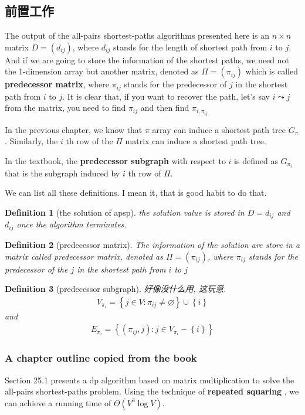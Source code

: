 \documentclass[a4paper, 10pt]{ctexart} %
\newtheorem{definition}{Definition}
\begin{document}
\subsection{前置工作}
The output of the all-pairs shortest-paths algorithms
presented here is an $n \times n   $ matrix $D = \left( d _{ij}\right)$, 
where $d _{ij}$ stands for the length of shortest path from 
$i$ to $j$. And if we are going to store the 
information of the 
shortest paths, we need not the 1-dimension 
array but another matrix, 
denoted as $\Pi = \left( \pi_{ij}\right)$ 
which is called \textbf{predecessor matrix}, where 
$\pi_{ij}$ stands for the predecessor of 
$j$ in the shortest path from $i$ to $j$.
It is clear that, if you want to 
recover the path, let's say $i \leadsto j$ from the matrix, you need to 
find $\pi_{ij}$ and then find $\pi_{i ,\pi_{ij}}$

In the previous chapter, we know that 
$\pi$ array can induce a shortest path tree $G_{\pi }$. 
Similarly, the $i$ th row of the $\Pi$ 
matrix can induce a shortest path tree.

In the textbook, the \textbf{predecessor subgraph} with respect to $i$ is defined
as $G_{\pi_{i}}$ that is the subgraph 
induced by $i$ th row of $\Pi$. 

We can list all these definitions. I mean it, that is 
good habit to do that.
\begin{definition}[the solution of apsp]
the solution value is stored in $D = d _{ij}$ and $d_{ij}$ once the algorithm 
terminates.
\end{definition}
\begin{definition}[predecessor matrix]
The information of the solution 
are store in a matrix called predecessor matrix, denoted as 
$\Pi = \left( \pi _{ij}\right)$, where $\pi_{ij}$ stands 
for the predecessor of the $j$ in the shortest
path from $i$ to $j$
\end{definition}
\begin{definition}[predecessor subgraph]
好像没什么用, 这玩意. 
\begin{align*}
    V_{\pi_{i}} = 
    \left\{ j \in V : \pi_{ij} \ne 
    \varnothing\right\} \cup \left\{i\right\}
\end{align*}
and
\begin{align*}
E_{\pi_{i}} = \left\{ \left( \pi_{ij} , j \right): j \in V_{\pi_{i}} - \left\{i\right\}\right\} 
\end{align*}
\end{definition}
\subsubsection{A chapter outline copied from the book}
Section 25.1 presents a dp algorithm based on matrix 
multiplication to solve the all-pairs shortest-paths problem.
Using the technique of 
\textbf{repeated squaring} , we can achieve a 
running time of $\varTheta  \left( V ^{3} \log  V\right)$. 
\end{document}
